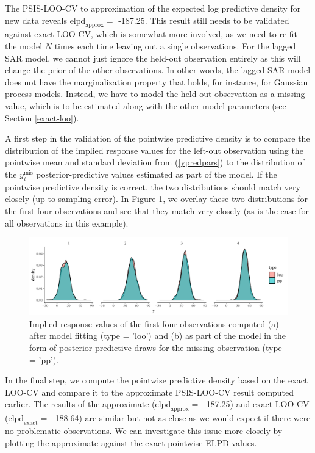 \documentclass[11pt]{article}
\begin{document}
The PSIS-LOO-CV to approximation of the expected log predictive density
for new data reveals \(\text{elpd}_{\text{approx}} =\) -187.25. This
result still needs to be validated against exact LOO-CV, which is
somewhat more involved, as we need to re-fit the model \(N\) times each
time leaving out a single observations. For the lagged SAR model, we
cannot just ignore the held-out observation entirely as this will change
the prior of the other observations. In other words, the lagged SAR
model does not have the marginalization property that holds, for
instance, for Gaussian process models. Instead, we have to model the
held-out observation as a missing value, which is to be estimated along
with the other model parameters (see Section \ref{exact-loo}).

A first step in the validation of the pointwise predictive density is to
compare the distribution of the implied response values for the left-out
observation using the pointwise mean and standard deviation from
(\ref{ypredpars}) to the distribution of the \(y_i^{\mathrm{mis}}\)
posterior-predictive values estimated as part of the model. If the
pointwise predictive density is correct, the two distributions should
match very closely (up to sampling error). In Figure \ref{fig:yplots},
we overlay these two distributions for the first four observations and
see that they match very closely (as is the case for all
observations in this example).

\begin{figure}
\includegraphics[width=0.95\linewidth]{yplots-1}
\caption{Implied response values of the first four observations computed (a) after model fitting (type = 'loo') and (b) as part of the model in the form of posterior-predictive draws for the missing observation (type = 'pp').}
\label{fig:yplots}
\end{figure}

In the final step, we compute the pointwise predictive density based on
the exact LOO-CV and compare it to the approximate PSIS-LOO-CV result
computed earlier. The results of the approximate
(\(\text{elpd}_{\text{approx}} =\) -187.25) and exact LOO-CV
(\(\text{elpd}_{\text{exact}} =\) -188.64) are similar but not as close
as we would expect if there were no problematic observations. We can
investigate this issue more closely by plotting the approximate against
the exact pointwise ELPD values.
\end{document}
